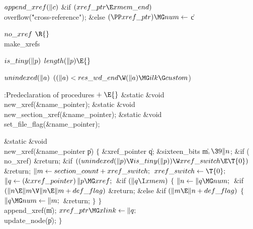 \Y\B\4\D$\\{append\_xref}(\|c)$ \6
\&{if} ${}(\\{xref\_ptr}\E\\{xmem\_end}){}$\1\5
\\{overflow}(\.{"cross-reference"});\2\6
\&{else} $(\PP\\{xref\_ptr})\MG\\{num}\K{}$\|c\par
\B\4\D$\\{no\_xref}$ \5
$\R{}$\\{make\_xrefs}\par
\B\4\D$\\{is\_tiny}(\|p)$ \5
$\\{length}(\|p)\E{}$\par
\B\4\D$\\{unindexed}(\|a)$ \5
$((\|a)<\\{res\_wd\_end}\W(\|a)\MG\\{ilk}\G\\{custom}{}$)\par
\Y\B\4:Predeclaration of procedures\X${}\mathrel+\E{}$\6
\&{static} \&{void} \\{new\_xref}(\&{name\_pointer});\6
\&{static} \&{void} \\{new\_section\_xref}(\&{name\_pointer});\6
\&{static} \&{void} \\{set\_file\_flag}(\&{name\_pointer});\par
\fi

\B\1\1\&{static} \&{void} \\{new\_xref}(\&{name\_pointer} \|p)\2\2\6
${}\{{}$\1\6
\&{xref\_pointer} \|q;\6
\&{sixteen\_bits} \|m${},\39\|n{}$;%
\7
\&{if} (\\{no\_xref})\1\5
\&{return};\2\6
\&{if} ${}((\\{unindexed}(\|p)\V\\{is\_tiny}(\|p))\W\\{xref\_switch}\E\T{0}){}$%
\1\5
\&{return};\2\6
${}\|m\leftarrow\\{section\_count}+\\{xref\_switch};{}$\6
${}\\{xref\_switch}\K\T{0};{}$\6
${}\|q\K(\&{xref\_pointer})\,\|p\MG\\{xref};{}$\6
\&{if} ${}(\|q\I\\{xmem}){}$\5
${}\{{}$\1\6
${}\|n\K\|q\MG\\{num};{}$\6
\&{if} ${}(\|n\E\|m\V\|n\E\|m+\\{def\_flag}){}$\1\5
\&{return};\2\6
\&{else} \&{if} ${}(\|m\E\|n+\\{def\_flag}){}$\5
${}\{{}$\1\6
${}\|q\MG\\{num}\K\|m;{}$\6
\&{return};\6
\4${}\}{}$\2\6
\4${}\}{}$\2\6
\\{append\_xref}(\|m);\6
${}\\{xref\_ptr}\MG\\{xlink}\K\|q;{}$\6
\\{update\_node}(\|p);\6
\4${}\}{}$\2\par
\fi

